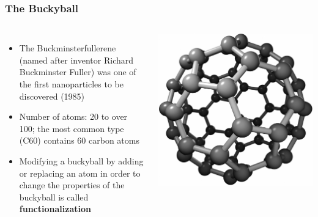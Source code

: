 \documentclass{beamer}
\begin{document}
\begin{frame}
	\frametitle{The Buckyball}
	\begin{columns}
		\begin{itemize}
			\item The Buckminsterfullerene (named after inventor Richard Buckminster Fuller) was one of the first nanoparticles to be discovered (1985)
			
			\item Number of atoms: 20 to over 100; the most common type (C60) contains 60 carbon atoms
					
			\item Modifying a buckyball by adding or replacing an atom in order to change the properties of the buckyball is called \textbf{functionalization}
		\end{itemize}
		\centering
		\includegraphics[scale=.2]{buckyball_white}
	\end{columns}
\end{frame}
\end{document}
